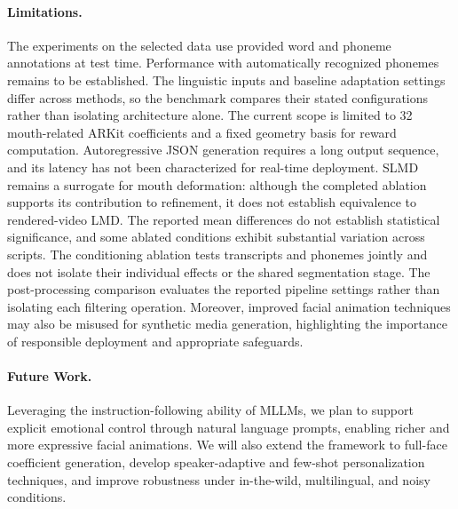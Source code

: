 \paragraph{Limitations.}
The experiments on the selected data use provided word and phoneme annotations at test time. Performance with automatically recognized phonemes remains to be established. The linguistic inputs and baseline adaptation settings differ across methods, so the benchmark compares their stated configurations rather than isolating architecture alone.
The current scope is limited to 32 mouth-related ARKit coefficients and a fixed geometry basis for reward computation. Autoregressive JSON generation requires a long output sequence, and its latency has not been characterized for real-time deployment.
SLMD remains a surrogate for mouth deformation: although the completed ablation supports its contribution to refinement, it does not establish equivalence to rendered-video LMD. The reported mean differences do not establish statistical significance, and some ablated conditions exhibit substantial variation across scripts. The conditioning ablation tests transcripts and phonemes jointly and does not isolate their individual effects or the shared segmentation stage. The post-processing comparison evaluates the reported pipeline settings rather than isolating each filtering operation.
Moreover, improved facial animation techniques may also be misused for synthetic media generation, highlighting the importance of responsible deployment and appropriate safeguards.
\paragraph{Future Work.}
 
Leveraging the instruction-following ability of MLLMs, we plan to support explicit emotional control through natural language prompts, enabling richer and more expressive facial animations. We will also extend the framework to full-face coefficient generation, develop speaker-adaptive and few-shot personalization techniques, and improve robustness under in-the-wild, multilingual, and noisy conditions.
